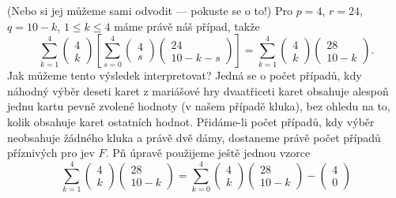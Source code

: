 \begin{example}
\begin{equation*}
    \end{equation*}
    (Nebo si jej můžeme sami odvodit — pokuste se o to!) Pro \(p = 4\), \(r = 24\), \(q = 10 - k\), 
    \(1 \leq k \leq 4\) máme právě náš případ, takže
    \begin{equation*}
      \sum^{4}_{k=1}\begin{pmatrix} 4  \\ k \end{pmatrix}
        \left[\sum^{4}_{s=0}\begin{pmatrix}  4 \\ s \end{pmatrix}
              \begin{pmatrix} 24 \\ 10 - k - s \end{pmatrix}
        \right] = 
        \sum^{4}_{k=1}\begin{pmatrix}  4 \\ k \end{pmatrix}
                      \begin{pmatrix} 28 \\ 10 - k \end{pmatrix}.
    \end{equation*}
    Jak můžeme tento výsledek interpretovat? Jedná se o počet případů, kdy náhodný výběr deseti 
    karet z mariášové hry dvaatřiceti karet obsahuje alespoň jednu kartu pevně zvolené hodnoty (v 
    našem případě kluka), bez ohledu na to, kolik obsahuje karet ostatních hodnot. Přidáme-li počet 
    případů, kdy výběr neobsahuje žádného kluka a právě dvě dámy, dostaneme právě počet případů 
    příznivých pro jev \(F\). Pň úpravě použijeme ještě jednou vzorce
    \begin{equation*}
      \sum^{4}_{k=1}\begin{pmatrix} 4 \\ k \end{pmatrix}\begin{pmatrix} 28 \\ 10 - k\end{pmatrix}
        = \sum^{4}_{k=0}\begin{pmatrix}  4 \\ k     \end{pmatrix}
                        \begin{pmatrix} 28 \\ 10 - k\end{pmatrix} -
                        \begin{pmatrix}  4 \\ 0     \end{pmatrix}

\end{equation*}
\end{example}
